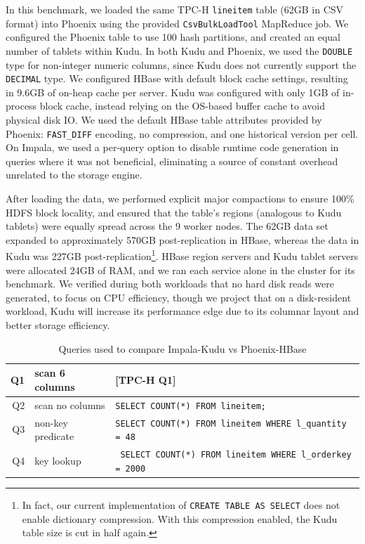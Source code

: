 \documentclass{vldb}
\begin{document}
In this benchmark, we loaded the same TPC-H {\tt lineitem} table (62GB in CSV format) into Phoenix
using the provided {\tt CsvBulkLoadTool} MapReduce job. We configured the Phoenix table to use 100
hash partitions, and created an equal number of tablets within Kudu. In both Kudu and Phoenix,
we used the {\tt DOUBLE} type for non-integer numeric columns, since Kudu does not currently
support the {\tt DECIMAL} type. We configured HBase with default block cache settings,
resulting in 9.6GB of on-heap cache per server. Kudu was configured with only 1GB of in-process
block cache, instead relying on the OS-based buffer cache to avoid physical disk IO.
We used the default HBase table attributes provided by Phoenix: {\tt FAST\_DIFF} encoding,
no compression, and one historical version per cell. On Impala, we used a per-query option
to disable runtime code generation in queries where it was not beneficial, eliminating a source
of constant overhead unrelated to the storage engine.

After loading the data, we performed explicit major compactions to ensure 100\% HDFS block locality,
and ensured that the table's regions (analogous to Kudu tablets) were equally spread across
the 9 worker nodes. The 62GB data set expanded to approximately 570GB post-replication
in HBase, whereas the data in Kudu was 227GB post-replication\footnote{In fact, our current
implementation of {\tt CREATE TABLE AS SELECT} does not enable dictionary compression. With
this compression enabled, the Kudu table size is cut in half again.}.
HBase region servers and Kudu tablet servers were allocated 24GB of RAM, and we ran each
service alone in the cluster for its benchmark. We verified during both workloads that
no hard disk reads were generated, to focus on CPU efficiency, though we project that
on a disk-resident workload, Kudu will increase its performance edge due to its columnar
layout and better storage efficiency.

\begin{table}
\begin{tabular}{r|l|l}
  Q1 & scan 6 columns & [TPC-H Q1]\\\hline
  Q2 & scan no columns & {\tt SELECT COUNT(*) FROM lineitem;}\\\hline
  Q3 & non-key predicate & \parbox{2in}{\tt \vspace{0.2em}SELECT COUNT(*) FROM lineitem WHERE l\_quantity = 48\vspace{0.2em}}\\\hline
  Q4 & key lookup        & \parbox{2in}{\tt \vspace{0.2em} SELECT COUNT(*) FROM lineitem WHERE l\_orderkey = 2000}
\end{tabular}
\caption{Queries used to compare Impala-Kudu vs Phoenix-HBase}
\label{tab:phoenix_queries}
\end{table}
\end{document}
